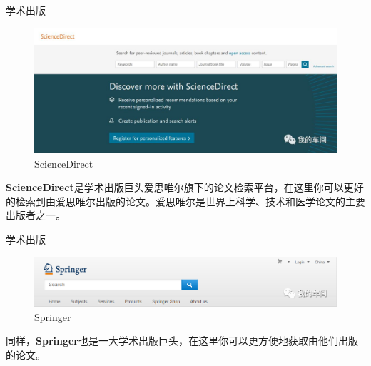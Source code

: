\documentclass[presentation]{beamer}
\begin{document}
\begin{frame}{学术出版}
    \begin{figure}
        \centering
          \includegraphics[width=0.7\linewidth]{_9.png}
          \caption{ScienceDirect}
    \end{figure}
	\textbf{ScienceDirect}是学术出版巨头爱思唯尔旗下的论文检索平台，在这里你可以更好的检索到由爱思唯尔出版的论文。爱思唯尔是世界上科学、技术和医学论文的主要出版者之一。
\end{frame}

\begin{frame}{学术出版}
    \begin{figure}
        \centering
          \includegraphics[width=0.7\linewidth]{_10.png}
          \caption{Springer}
    \end{figure}
	同样，\textbf{Springer}也是一大学术出版巨头，在这里你可以更方便地获取由他们出版的论文。
\end{frame}
\end{document}
